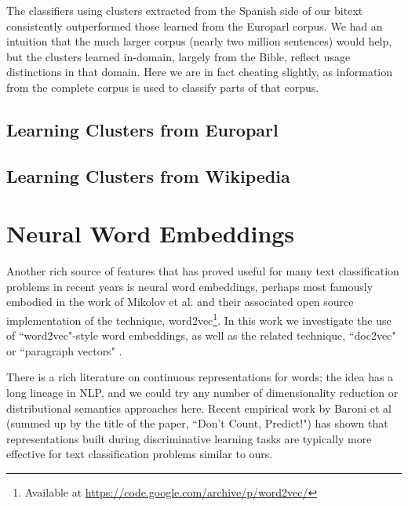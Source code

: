 The classifiers using clusters extracted from the Spanish side of our bitext
consistently outperformed those learned from the Europarl corpus. We had an
intuition that the much larger corpus (nearly two million sentences) would
help, but the clusters learned in-domain, largely from the Bible, reflect
usage distinctions in that domain. Here we are in fact cheating slightly, as
information from the complete corpus is used to classify parts of that corpus.


\subsection{Learning Clusters from Europarl}

\subsection{Learning Clusters from Wikipedia}


\section{Neural Word Embeddings}


Another rich source of features that has proved useful for many text
classification problems in recent years is neural word embeddings, perhaps most
famously embodied in the work of Mikolov et al. \cite{mikolovword2vec} and
their associated open source implementation of the technique,
word2vec\footnote{Available at
\url{https://code.google.com/archive/p/word2vec/}}. In this work we investigate
the use of ``word2vec"-style word embeddings, as well as the related technique,
``doc2vec" or ``paragraph vectors"
\cite{dai-document-embedding-2015,quocle-distributed-representations-2014}.

There is a rich literature on continuous representations for words; the idea
has a long lineage in NLP, and we could try any number of dimensionality
reduction or distributional semantics approaches here. Recent empirical work by
Baroni et al \cite{baroni2014don} (summed up by the title of the paper, ``Don't
Count, Predict!") has shown that representations built during discriminative
learning tasks are typically more effective for text classification problems
similar to ours.

